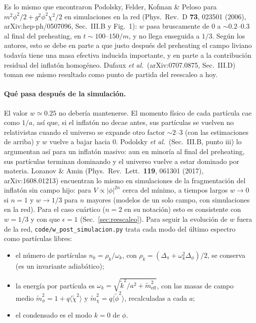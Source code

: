 \documentclass[11pt]{article}
\begin{document}
            Es lo mismo que encontraron Podolsky, Felder, Kofman \& Peloso para $m^2\phi^2/2 + g^2\phi^2\chi^2/2$ en simulaciones en la red (Phys.\ Rev.\ D \textbf{73}, 023501 (2006), arXiv:hep-ph/0507096, Sec.~III.B y Fig.~1): $w$ pasa bruscamente de $0$ a $\sim 0.2$--$0.3$ al final del preheating, en $t \sim 100$--$150/m$, y no llega enseguida a $1/3$. Según los autores, esto se debe en parte a que justo después del preheating el campo liviano todavía tiene una masa efectiva inducida importante, y en parte a la contribución residual del inflatón homogéneo. Dufaux \emph{et al.}\ (arXiv:0707.0875, Sec.~III.D) toman ese mismo resultado como punto de partida del reescaleo a hoy.

            \paragraph{Qué pasa después de la simulación.} El valor $w \simeq 0.25$ no debería mantenerse. El momento físico de cada partícula cae como $1/a$, así que, si el inflatón no decae antes, sus partículas se vuelven no relativistas cuando el universo se expande otro factor $\sim 2$--$3$ (con las estimaciones de arriba) y $w$ vuelve a bajar hacia 0. Podolsky \emph{et al.}\ (Sec.~III.B, punto iii) lo argumentan así para un inflatón masivo: aun en minoría al final del preheating, sus partículas terminan dominando y el universo vuelve a estar dominado por materia. Lozanov \& Amin (Phys.\ Rev.\ Lett.\ \textbf{119}, 061301 (2017), arXiv:1608.01213) encuentran lo mismo en simulaciones de la fragmentación del inflatón sin campo hijo: para $V \propto |\phi|^{2n}$ cerca del mínimo, a tiempos largos $w \to 0$ si $n = 1$ y $w \to 1/3$ para $n$ mayores (modelos de un solo campo, con simulaciones en la red). Para el caso cuártico ($n = 2$ en su notación) esto es consistente con $w = 1/3$ y con que $\epsilon = 1$ (Sec.~\ref{sec:reescaleo}). Para seguir la evolución de $w$ fuera de la red, \texttt{code/w\_post\_simulacion.py} trata cada modo del último espectro como partículas libres:
            \begin{itemize}
                \item el número de partículas $n_k = \rho_k/\omega_k$, con $\rho_k = (\Delta_{\pi} + \omega_k^2\Delta_\phi)/2$, se conserva (es un invariante adiabático);
                \item la energía por partícula es $\omega_k = \sqrt{\tilde k^2/a^2 + \tilde m_{\text{eff}}^2}$, con las masas de campo medio $\tilde m_\phi^2 = 1 + q\langle\tilde\chi^2\rangle$ y $\tilde m_\chi^2 = q\langle\tilde\phi^2\rangle$, recalculadas a cada $a$;
                \item el condensado es el modo $k = 0$ de $\phi$.
            \end{itemize}
\end{document}
